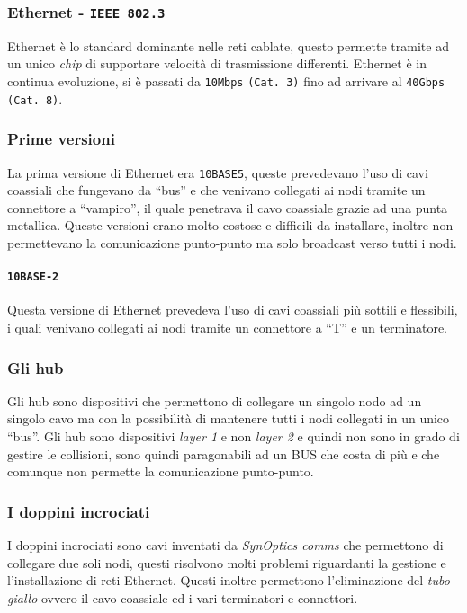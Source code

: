         \subsubsection{Ethernet - \texttt{\Acrshort*{IEEE} 802.3}}
            Ethernet è lo standard dominante nelle reti cablate, questo permette tramite ad un unico \textit{chip} di supportare velocità di trasmissione differenti. Ethernet è in continua evoluzione, si è passati da \texttt{10Mbps} \texttt{(Cat. 3)} fino ad arrivare al \texttt{40Gbps} \texttt{(Cat. 8)}.
        \subsubsection{Prime versioni} La prima versione di Ethernet era \texttt{10BASE5}, queste prevedevano l'uso di cavi coassiali che fungevano da ``bus'' e che venivano collegati ai nodi tramite un connettore a ``vampiro'', il quale penetrava il cavo coassiale grazie ad una punta metallica. Queste versioni erano molto costose e difficili da installare, inoltre non permettevano la comunicazione punto-punto ma solo broadcast verso tutti i nodi.
        \paragraph{\texttt{10BASE-2}}  Questa versione di Ethernet prevedeva l'uso di cavi coassiali più sottili e flessibili, i quali venivano collegati ai nodi tramite un connettore a ``T'' e un terminatore. 
        \subsubsection{Gli hub} Gli hub sono dispositivi che permettono di collegare un singolo nodo ad un singolo cavo ma con la possibilità di mantenere tutti i nodi collegati in un unico ``bus''. Gli hub sono dispositivi \textit{layer 1} e non \textit{layer 2} e quindi non sono in grado di gestire le collisioni, sono quindi paragonabili ad un \Acrshort*{BUS} che costa di più e che comunque non permette la comunicazione punto-punto.
        \subsubsection{I doppini incrociati} I doppini incrociati sono cavi inventati da \textit{SynOptics comms} che permettono di collegare due soli nodi, questi risolvono molti problemi riguardanti la gestione e l'installazione di reti Ethernet. Questi inoltre permettono l'eliminazione del \textit{tubo giallo} ovvero il cavo coassiale ed i vari terminatori e connettori.
